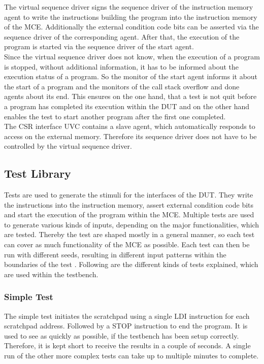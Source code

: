 The virtual sequence driver signs the sequence driver of the instruction memory agent to write the instructions building the program into the instruction memory
of the MCE.
Additionally the external condition code bits can be asserted via the sequence driver of the corresponding agent.
After that, the execution of the program is started via the sequence driver of the start agent.\\
Since the virtual sequence driver does not know, when the execution of a program is stopped, without additional information, it has to be informed about the
execution status of a program.
So the monitor of the start agent informs it about the start of a program and the monitors of the call stack overflow and done agents about its end.
This ensures on the one hand, that a test is not quit before a program has completed its execution within the DUT and on the other hand enables the test to
start another program after the first one completed.\\
The CSR interface UVC contains a slave agent, which automatically responds to access on the external memory.
Therefore its sequence driver does not have to be controlled by the virtual sequence driver.

\subsection{Test Library}

Tests are used to generate the stimuli for the interfaces of the DUT. They write the instructions into the instruction memory, assert external condition code
bits and start the execution of the program within the MCE. Multiple tests are used to generate various kinds of inputs, depending on the major functionalities,
which are tested. Thereby the test are shaped mostly in  a general manner, so each test can cover as much functionality of the MCE as possible. Each test can
then be run with different seeds, resulting in different input patterns within the boundaries of the test \cite{sv_verification}.
Following are the different kinds of tests explained, which are used within the testbench.

\subsubsection{Simple Test}

The simple test initiates the scratchpad using a single LDI instruction for each scratchpad address. 
Followed by a STOP instruction to end the program.
It is used to see as quickly as possible, if the testbench has been setup correctly.
Therefore, it is kept short to receive the results in a couple of seconds.
A single run of the other more complex tests can take up to multiple minutes to complete.

